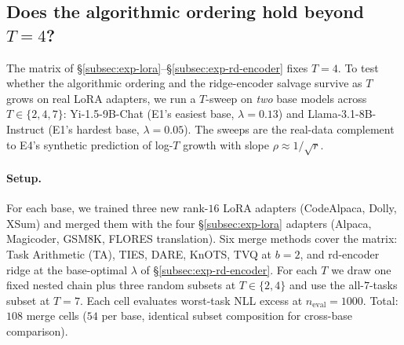 
\subsection{Does the algorithmic ordering hold beyond $T=4$?}
\label{subsec:exp-T-scaling}

The matrix of \S\ref{subsec:exp-lora}--\S\ref{subsec:exp-rd-encoder}
fixes $T=4$. To test whether the algorithmic ordering and the
ridge-encoder salvage survive as $T$ grows on real LoRA adapters, we
run a $T$-sweep on \emph{two} base models across $T \in \{2, 4, 7\}$:
Yi-1.5-9B-Chat (E1's easiest base, $\lambda = 0.13$) and
Llama-3.1-8B-Instruct (E1's hardest base, $\lambda = 0.05$). The
sweeps are the real-data complement to E4's synthetic prediction of
log-$T$ growth with slope $\rho \approx 1 / \sqrt{r}$.

\paragraph{Setup.} For each base, we trained three new rank-$16$ LoRA
adapters (CodeAlpaca, Dolly, XSum) and merged them with the four
\S\ref{subsec:exp-lora} adapters (Alpaca, Magicoder, GSM8K, FLORES
translation). Six merge methods cover the matrix: Task Arithmetic
(TA), TIES, DARE, KnOTS, TVQ at $b=2$, and rd-encoder ridge at the
base-optimal $\lambda$ of \S\ref{subsec:exp-rd-encoder}. For each $T$
we draw one fixed nested chain plus three random subsets at
$T \in \{2, 4\}$ and use the all-$7$-tasks subset at $T = 7$. Each
cell evaluates worst-task NLL excess at $n_{\text{eval}} = 1000$.
Total: $108$ merge cells ($54$ per base, identical subset
composition for cross-base comparison).

